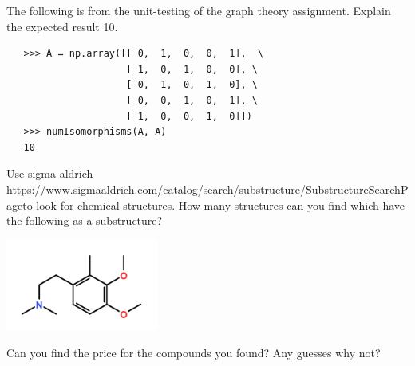 \documentclass[10pt]{article}
\begin{document}

\noindent The following is from the unit-testing of the graph theory assignment. Explain the expected result 10.

\begin{verbatim}
   >>> A = np.array([[ 0,  1,  0,  0,  1],  \
                     [ 1,  0,  1,  0,  0], \
                     [ 0,  1,  0,  1,  0], \
                     [ 0,  0,  1,  0,  1], \
                     [ 1,  0,  0,  1,  0]])
   >>> numIsomorphisms(A, A)
   10
\end{verbatim}



\noindent Use sigma aldrich \url{https://www.sigmaaldrich.com/catalog/search/substructure/SubstructureSearchPage}to look for chemical structures. How many structures can you find which have the following as a substructure?

\includegraphics[width=5cm]{mesc.png}

Can you find the price for the compounds you found? Any guesses why not?
\end{document}
